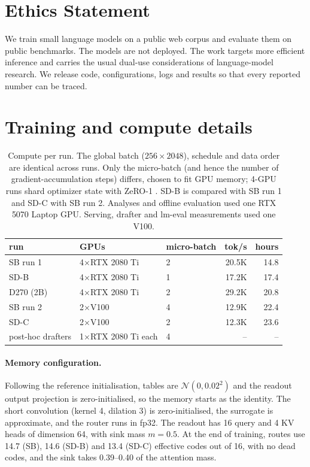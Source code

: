 \documentclass[11pt]{article}
\newcommand{\SB}{\textsc{SB}}
\newcommand{\SDB}{\textsc{SD-B}}
\newcommand{\SDC}{\textsc{SD-C}}
\newcommand{\Dense}{\textsc{D270}}
\begin{document}
\section*{Ethics Statement}
We train small language models on a public web corpus \citep{diao2025climb} and evaluate them on public benchmarks.
The models are not deployed. The work targets more efficient inference and carries the usual dual-use considerations of
language-model research. We release code, configurations, logs and results so that every reported number can be traced.



\appendix

\section{Training and compute details}
\label{app:train}

\begin{table}[h]
\centering
\small
\setlength{\tabcolsep}{3pt}
\begin{tabular}{lllrr}
\toprule
run & GPUs & micro-batch & tok/s & hours \\
\midrule
\SB{} run 1 & 4$\times$RTX 2080 Ti & 2 & 20.5K & 14.8 \\
\SDB & 4$\times$RTX 2080 Ti & 1 & 17.2K & 17.4 \\
\Dense{} (2B) & 4$\times$RTX 2080 Ti & 2 & 29.2K & 20.8 \\
\SB{} run 2 & 2$\times$V100 & 4 & 12.9K & 22.4 \\
\SDC & 2$\times$V100 & 2 & 12.3K & 23.6 \\
post-hoc drafters & 1$\times$RTX 2080 Ti each & 4 & -- & -- \\
\bottomrule
\end{tabular}
\caption{Compute per run. The global batch ($256\times2048$), schedule and data order are identical across runs. Only the
micro-batch (and hence the number of gradient-accumulation steps) differs, chosen to fit GPU memory; 4-GPU runs shard optimizer state with ZeRO-1 \citep{rajbhandari2020zero}. \SDB{} is compared
with \SB{} run 1 and \SDC{} with \SB{} run 2. Analyses and offline evaluation used one RTX 5070 Laptop GPU. Serving, drafter
and lm-eval measurements used one V100.}
\end{table}

\paragraph{Memory configuration.}
Following the reference initialisation, tables are $\mathcal{N}(0,0.02^2)$ and the readout output projection is
zero-initialised, so the memory starts as the identity. The short convolution (kernel 4, dilation 3) is zero-initialised,
the surrogate is approximate, and the router runs in fp32. The readout has 16 query and 4 KV heads of dimension 64, with sink
mass $m=0.5$. At the end of training, routes use 14.7 (\SB), 14.6 (\SDB) and 13.4 (\SDC) effective codes out of 16, with
no dead codes, and the sink takes 0.39--0.40 of the attention mass.
\end{document}
